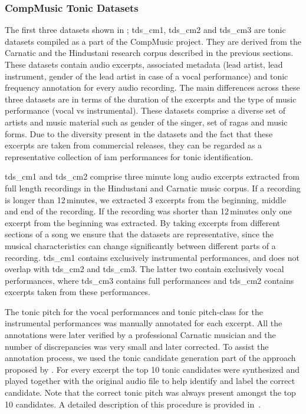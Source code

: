 {\subsubsection{CompMusic Tonic Datasets}
\label{sec:corpus_compmusic_tonic_dataset}

The first three datasets shown in ; \acrshort{tds_cm1}, \acrshort{tds_cm2} and \acrshort{tds_cm3} are tonic datasets compiled as a part of the CompMusic project. They are derived from the Carnatic and the Hindustani research corpus described in the previous sections. These datasets contain audio excerpts, associated metadata (lead artist, lead instrument, gender of the lead artist in case of a vocal performance) and tonic frequency annotation for every audio recording. The main differences across these three datasets are in terms of the duration of the excerpts and the type of music performance (vocal vs instrumental). These datasets comprise a diverse set of artists and music material such as gender of the singer, set of \glspl{raga} and music forms. Due to the diversity present in the datasets and the fact that these excerpts are taken from commercial releases, they can be regarded as a representative collection of \gls{iam} performances for tonic identification.  

\acrshort{tds_cm1} and \acrshort{tds_cm2} comprise three minute long audio excerpts extracted from full length recordings in the Hindustani and Carnatic music corpus. If a recording is longer than 12\,minutes, we extracted 3 excerpts from the beginning, middle and end of the recording. If the recording was shorter than 12\,minutes only one excerpt from the beginning was extracted. By taking excerpts from different sections of a song we ensure that the datasets are representative, since the musical characteristics can change significantly between different parts of a recording. \acrshort{tds_cm1} contains exclusively instrumental performances, and does not overlap with \acrshort{tds_cm2} and \acrshort{tds_cm3}. The latter two contain exclusively vocal performances, where \acrshort{tds_cm3} contains full performances and \acrshort{tds_cm2} contains excerpts taken from these performances. 

The tonic pitch for the vocal performances and tonic pitch-class for the instrumental performances was manually annotated for each excerpt. All the annotations were later verified by a professional Carnatic musician and the number of discrepancies was very small and later corrected. To assist the annotation process, we used the tonic candidate generation part of the approach proposed by \cite{salamon2012multipitch}. For every excerpt the top 10 tonic candidates were synthesized and played together with the original audio file to help identify and label the correct candidate. Note that the correct tonic pitch was always present amongst the top 10 candidates. A detailed description of this procedure is provided in~\cite{SGulati_MThesis2012}.


}
